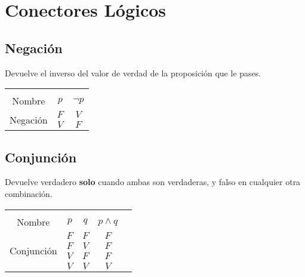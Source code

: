 \documentclass[12pt, fleqn]{report}                             %
\theoremstyle{break}                                            %
\begin{document}
        \clearpage
        \section{Conectores Lógicos}

            \subsection{Negación}

                Devuelve el inverso del valor de verdad de la proposición que le pases.\\

                \begin{tabular}{ |c|c|c| } 
                    \hline &&\\
                    \large{Nombre} & $p$ & $\lnot p$ \\[0.5em]
                    \hline
                    \multirow{2}{5em}{Negación}
                    & $F$ & $V$  \\ \cline{2-3}
                    & $V$ & $F$  \\ \cline{2-3}
                    \hline
                \end{tabular}

            \subsection{Conjunción}

                Devuelve verdadero \textbf{solo} cuando ambas son verdaderas, y falso en cualquier
                otra combinación.\\

                \begin{tabular}{ |c|c|c|c|c| } 
                    \hline &&&\\
                    \large{Nombre} & $p$ & $q$ & $p \land q$ \\[0.5em]
                    \hline
                    \multirow{4}{5em}{Conjunción}
                    & $F$ & $F$ & $F$ \\ \cline{2-4}
                    & $F$ & $V$ & $F$ \\ \cline{2-4}
                    & $V$ & $F$ & $F$ \\ \cline{2-4}
                    & $V$ & $V$ & $V$ \\ 
                    \hline
                \end{tabular}
\end{document}
